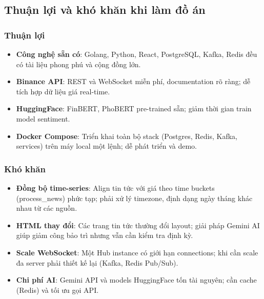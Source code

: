\subsection{Thuận lợi và khó khăn khi làm đồ án}

\subsubsection{Thuận lợi}

\begin{itemize}
    \item \textbf{Công nghệ sẵn có}: Golang, Python, React, PostgreSQL, Kafka, Redis đều có tài liệu phong phú và cộng đồng lớn.
    \item \textbf{Binance API}: REST và WebSocket miễn phí, documentation rõ ràng; dễ tích hợp dữ liệu giá real-time.
    \item \textbf{HuggingFace}: FinBERT, PhoBERT pre-trained sẵn; giảm thời gian train model sentiment.
    \item \textbf{Docker Compose}: Triển khai toàn bộ stack (Postgres, Redis, Kafka, services) trên máy local một lệnh; dễ phát triển và demo.
\end{itemize}

\subsubsection{Khó khăn}

\begin{itemize}
    \item \textbf{Đồng bộ time-series}: Align tin tức với giá theo time buckets (process\_news) phức tạp; phải xử lý timezone, định dạng ngày tháng khác nhau từ các nguồn.
    \item \textbf{HTML thay đổi}: Các trang tin tức thường đổi layout; giải pháp Gemini AI giúp giảm công bảo trì nhưng vẫn cần kiểm tra định kỳ.
    \item \textbf{Scale WebSocket}: Một Hub instance có giới hạn connections; khi cần scale đa server phải thiết kế lại (Kafka, Redis Pub/Sub).
    \item \textbf{Chi phí AI}: Gemini API và models HuggingFace tốn tài nguyên; cần cache (Redis) và tối ưu gọi API.
\end{itemize}
